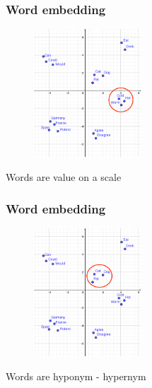 
\begin{frame}
	\frametitle{Word embedding}

	\begin{figure}
		\includegraphics[width=4cm]{./figures/Group_scale}

	\end{figure}
		\begin{center}
		{Words are value on a scale}
		\end{center}
	\vspace{-0.5cm}

\end{frame}



\begin{frame}
	\frametitle{Word embedding}

	\begin{figure}
		\includegraphics[width=4cm]{./figures/Group_hyponym}
	\end{figure}
		\begin{center}
		{Words are hyponym - hypernym}
		\end{center}
	\vspace{-0.5cm}

\end{frame}

